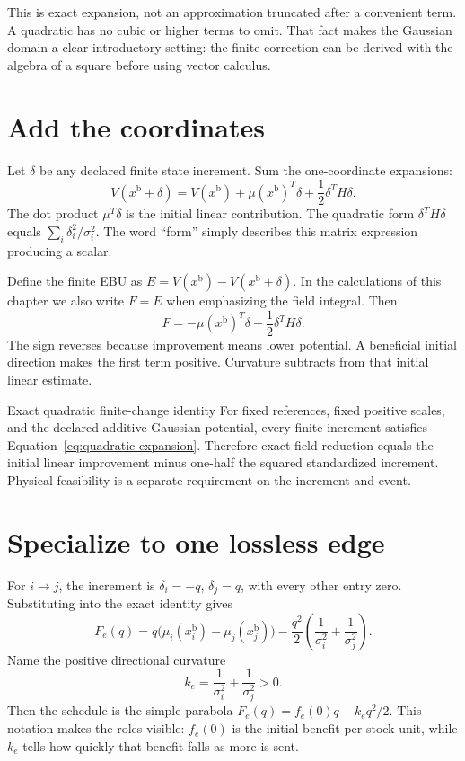This is exact expansion, not an approximation truncated after a convenient term. A quadratic has no cubic or higher terms to omit. That fact makes the Gaussian domain a clear introductory setting: the finite correction can be derived with the algebra of a square before using vector calculus.

\section{Add the coordinates}
Let \(\delta\) be any declared finite state increment. Sum the one-coordinate expansions:
\begin{equation}\label{eq:quadratic-expansion}
 V(x^{\mathrm{b}}+\delta)=V(x^{\mathrm{b}})+\mu(x^{\mathrm{b}})^T\delta+\frac12\delta^TH\delta.
\end{equation}
The dot product \(\mu^T\delta\) is the initial linear contribution. The quadratic form \(\delta^TH\delta\) equals \(\sum_i\delta_i^2/\sigma_i^2\). The word ``form'' simply describes this matrix expression producing a scalar.

Define the finite EBU as \(E=V(x^{\mathrm{b}})-V(x^{\mathrm{b}}+\delta)\). In the calculations of this chapter we also write \(F=E\) when emphasizing the field integral. Then
\begin{equation}\label{eq:quadratic-field-reduction}
 F=-\mu(x^{\mathrm{b}})^T\delta-\frac12\delta^TH\delta.
\end{equation}
The sign reverses because improvement means lower potential. A beneficial initial direction makes the first term positive. Curvature subtracts from that initial linear estimate.

\begin{lawbox}{Exact quadratic finite-change identity}
For fixed references, fixed positive scales, and the declared additive Gaussian potential, every finite increment satisfies Equation~\ref{eq:quadratic-expansion}. Therefore exact field reduction equals the initial linear improvement minus one-half the squared standardized increment. Physical feasibility is a separate requirement on the increment and event.
\end{lawbox}

\section{Specialize to one lossless edge}
For \(i\to j\), the increment is \(\delta_i=-q\), \(\delta_j=q\), with every other entry zero. Substituting into the exact identity gives
\begin{equation}\label{eq:finite-lossless-field}
 F_e(q)=q\bigl(\mu_i(x^{\mathrm{b}}_i)-\mu_j(x^{\mathrm{b}}_j)\bigr)
       -\frac{q^2}{2}\left(\frac1{\sigma_i^2}+\frac1{\sigma_j^2}\right).
\end{equation}
Name the positive directional curvature
\begin{equation}
 k_e=\frac1{\sigma_i^2}+\frac1{\sigma_j^2}>0.
\end{equation}
Then the schedule is the simple parabola \(F_e(q)=f_e(0)q-k_eq^2/2\). This notation makes the roles visible: \(f_e(0)\) is the initial benefit per stock unit, while \(k_e\) tells how quickly that benefit falls as more is sent.

